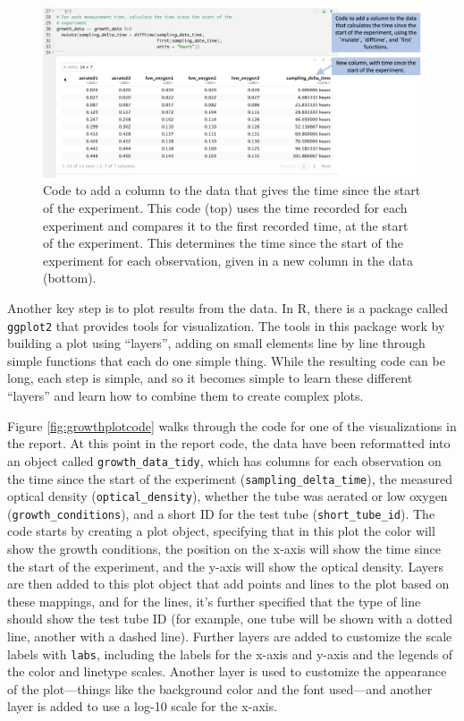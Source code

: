 \documentclass[]{tufte-book}
\begin{document}
\begin{figure}
\includegraphics[width=\textwidth]{figures/growth_curve_adddifftime} \caption[Code to add a column to the data that gives the time since the start of the experiment]{Code to add a column to the data that gives the time since the start of the experiment. This code (top) uses the time recorded for each experiment and compares it to the first recorded time, at the start of the experiment. This determines the time since the start of the experiment for each observation, given in a new column in the data (bottom).}\label{fig:growthadddifftime}
\end{figure}

Another key step is to plot results from the data. In R, there is a package
called \texttt{ggplot2} that provides tools for visualization. The tools in this
package work by building a plot using ``layers'', adding on small elements
line by line through simple functions that each do one simple thing.
While the resulting code can be long, each step is simple, and so it
becomes simple to learn these different ``layers'' and learn how to combine
them to create complex plots.

Figure \ref{fig:growthplotcode} walks through the code for one of the
visualizations in the report. At this point in the report code, the data have
been reformatted into an object called \texttt{growth\_data\_tidy}, which has columns for
each observation on the time since the start of the experiment
(\texttt{sampling\_delta\_time}), the measured optical density (\texttt{optical\_density}),
whether the tube was aerated or low oxygen (\texttt{growth\_conditions}), and a short ID
for the test tube (\texttt{short\_tube\_id}). The code starts by creating a plot object,
specifying that in this plot the color will show the growth conditions, the
position on the x-axis will show the time since the start of the experiment, and
the y-axis will show the optical density. Layers are then added to this plot
object that add points and lines to the plot based on these mappings, and for
the lines, it's further specified that the type of line should show the test
tube ID (for example, one tube will be shown with a dotted line, another with a
dashed line). Further layers are added to customize the scale labels with
\texttt{labs}, including the labels for the x-axis and y-axis and the legends of the
color and linetype scales. Another layer is used to customize the appearance of
the plot---things like the background color and the font used---and another
layer is added to use a log-10 scale for the x-axis.
\end{document}
